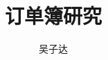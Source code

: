 \documentclass[a4paper,12pt]{book}
\begin{document}
\author{吴子达}
\title{订单簿研究}
\frontmatter
\maketitle
\tableofcontents

\mainmatter




\backmatter
\end{document}

